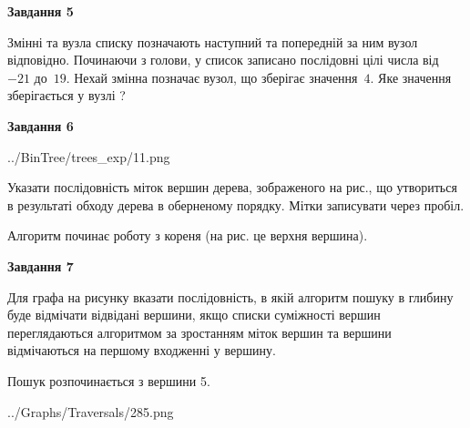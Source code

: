 \documentclass[12pt, ukrainian]{article}
\begin{document}
{\begin {large}
{\begin {center}\textbf{Завдання 5}\end {center}}\par
Змінні  та  вузла списку позначають наступний та попередній за ним вузол відповідно. Починаючи з голови, у список записано послідовні цілі числа від~$-21$ до~$19$. Нехай змінна  позначає вузол, що зберігає значення~$4$.
Яке значення зберігається у вузлі  ?\par
\newpage

{\begin {center}\textbf{Завдання 6}\end {center}}\par

\begin{center}
	{../BinTree/trees_exp/11.png}
\end{center}
Указати послідовність міток вершин дерева, зображеного на рис., що утвориться в результаті обходу дерева в оберненому порядку. Мітки записувати через пробіл.\par Алгоритм починає роботу з кореня (на рис. це верхня вершина).\par
\newpage

{\begin {center}\textbf{Завдання 7}\end {center}}\par
Для графа на рисунку вказати послідовність, в якій алгоритм пошуку в глибину буде відмічати відвідані вершини, якщо списки суміжності вершин переглядаються алгоритмом за зростанням міток вершин та вершини відмічаються на першому вход\-женні у вершину.\par
Пошук розпочинається з вершини 5.\par

\begin{center}
	{../Graphs/Traversals/285.png}
\end{center}\par
\newpage


\end{large}}
\end{document}
